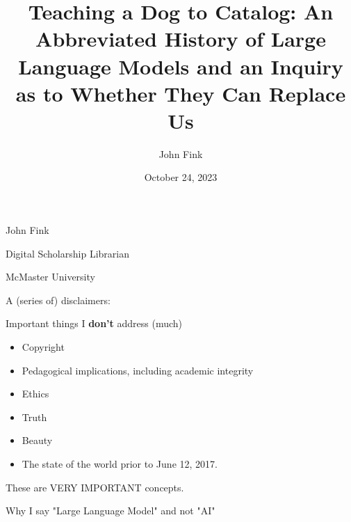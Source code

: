 \documentclass[handout]{beamer} %
\title{Teaching a Dog to Catalog: An Abbreviated History of Large Language Models and an Inquiry as to Whether They Can Replace Us}
\author{John Fink}
\institute{McMaster University}
\date{October 24, 2023}
\begin{document}
\begin{frame}
    \maketitle
\end{frame}

\begin{frame}
	John Fink
	
	Digital Scholarship Librarian
	
	McMaster University
\end{frame}




\begin{frame}
	A (series of) disclaimers:
\end{frame}
 
 

 \begin{frame}[plain]
 \end{frame}

\begin{frame}{Important things I \textbf{don't} address (much)}
	\begin{itemize}
		\item Copyright
		\pause
		\item Pedagogical implications, including academic integrity
		\pause
		\item Ethics
		\pause
		\item Truth
		\pause
		\item Beauty
		\pause
		\item The state of the world prior to June 12, 2017.
	\end{itemize}
\end{frame}

\begin{frame}
	These are VERY IMPORTANT concepts.
\end{frame}

\begin{frame}
	Why I say "Large Language Model" and not "AI"
\end{frame}
\end{document}
